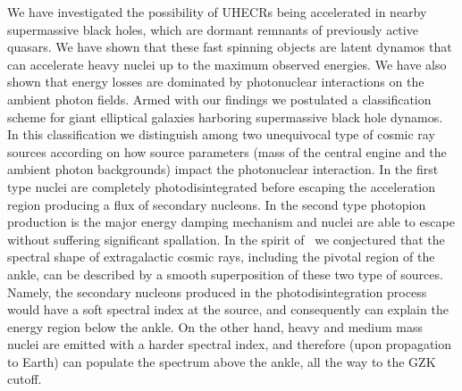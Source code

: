 \documentclass[aps,prd,twocolumn,superscriptaddress,tightenlines,nofootinbib]{revtex4-1}
\begin{document}
\label{sec:5}

We have investigated the possibility of UHECRs being accelerated in
nearby supermassive black holes, which are dormant remnants of
previously active quasars. We have shown that these fast spinning objects
are latent dynamos that can accelerate heavy nuclei up to the maximum
observed energies. We have also shown that energy losses are dominated by
photonuclear interactions on the ambient photon fields. Armed with our
findings we postulated a classification scheme for giant elliptical
galaxies harboring supermassive black hole dynamos. In
this classification we distinguish among two unequivocal type of
cosmic ray sources according on how source
parameters (mass of the central engine and the ambient photon
backgrounds) impact the photonuclear interaction. In the first type nuclei are completely
photodisintegrated before escaping the acceleration region producing a
flux of secondary nucleons. In the
second type  photopion production is the major energy damping
mechanism and nuclei are able to escape without suffering significant spallation. In
the spirit of~\cite{Aloisio:2013hya,Unger:2015laa} we conjectured that
the spectral shape of extragalactic cosmic rays, including the pivotal
region of the ankle, can be described by a smooth superposition of
these two type of sources. Namely, the secondary nucleons produced in
the photodisintegration process would have a soft spectral index at
the source, and consequently can explain the energy region below the
ankle.  On the other hand, heavy and medium mass nuclei are emitted
with a harder spectral index, and therefore (upon propagation to
Earth) can populate the spectrum above the ankle, all the way to the
GZK cutoff.



\onecolumngrid
\end{document}
